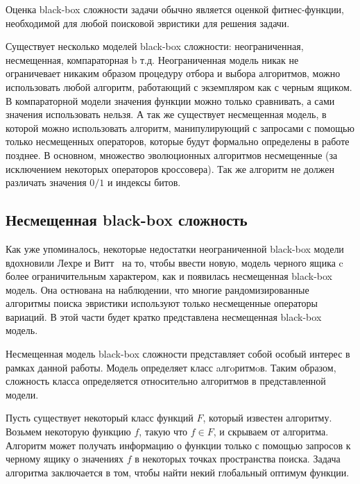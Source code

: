 Оценка black-box сложности задачи обычно является оценкой фитнес-функции, необходимой для любой поисковой эвристики для решения задачи.

Существует несколько моделей black-box сложности: неограниченная, несмещенная, компараторная b т.д. Неограниченная модель никак не ограничевает никаким образом процедуру отбора и выбора алгоритмов, можно использовать любой алгоритм, работающий с экземпляром как с черным ящиком. В компараторной модели значения функции можно только сравнивать, а сами значения использовать нельзя. А так же существует несмещенная модель, в которой можно использовать алгоритм, манипулирующий с запросами с помощью только несмещенных операторов, которые будут формально определены в работе позднее. В основном, множество эволюционных алгоритмов несмещенные (за исключением некоторых операторов кроссовера). Так же алгоритм не должен различать значения $0/1$ и индексы битов.

\subsection{Несмещенная black-box сложность}
Как уже упоминалось, некоторые недостатки неограниченной black-box модели вдохновили Лехре и Витт~\cite{1} на то, чтобы ввести новую, модель черного ящика c более ограничительным характером, как и 
появилась несмещенная black-box модель. Она остнована на наблюдении, что многие рандомизированные алгоритмы поиска эвристики используют только несмещенные операторы вариаций. 
В этой части будет кратко представлена несмещенная black-box модель. 

Несмещенная модель black-box сложности  представляет собой особый интерес в рамках данной работы. Модель определяет класс aлгoритмoв. Таким образом, сложность класса определяется относительно алгоритмов
в представленной модели.

Пусть существует некоторый класс функций $F$, который известен алгоритму. Возьмем некоторую функцию $f$, такую что $f \in F$, и скрываем от алгоритма. Алгоритм может получать информацию о функции 
только с помощью запросов к черному ящику о значениях $f$ в некоторых точках пространства поиска. Задача алгоритма заключается в том, чтобы найти некий глобальный оптимум функции.



